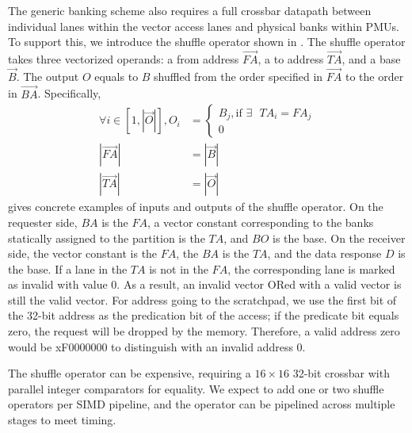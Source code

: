 The generic banking scheme also requires a full crossbar datapath between individual lanes within
the vector access lanes and physical banks within PMUs. 
To support this, we introduce the shuffle operator shown in .
The shuffle operator takes three vectorized operands: a from address $\overrightarrow{FA}$, a to address
$\overrightarrow{TA}$, and a base $\overrightarrow{B}$.
The output $O$ equals to $B$ shuffled from the order specified in $\overrightarrow{FA}$ to the order in
$\overrightarrow{BA}$. 
Specifically,
\begin{align}
\forall i \in [1,|\overrightarrow{O}|],
O_i &= \begin{cases}
B_j, \text{if $\exists$ $TA_i = FA_j$}\\
0
\end{cases} \\
|\overrightarrow{FA}| &= |\overrightarrow{B}| \\
|\overrightarrow{TA}| &= |\overrightarrow{O}|
\end{align}
 gives concrete examples of inputs and outputs of the shuffle operator.
On the requester side, $BA$ is the $FA$, a vector constant corresponding to the banks statically
assigned to the partition is the $TA$, and $BO$ is the base.
On the receiver side, the vector constant is the $FA$, the $BA$ is the $TA$, and the data response
$D$ is the base.
If a lane in the $TA$ is not in the $FA$, the corresponding lane is marked as invalid with value
$0$. As a result, an invalid vector ORed with a valid vector is still the valid vector.
For address going to the scratchpad, we use the first bit of the 32-bit address as the predication
bit of the access; if the predicate bit equals zero, the request will be dropped by the memory.
Therefore, a valid address zero would be xF0000000 to distinguish with an invalid address 0.

The shuffle operator can be expensive, requiring a $16\times16$ 32-bit crossbar with parallel
integer comparators for equality. We expect to add one or two shuffle operators per SIMD pipeline,
and the operator can be pipelined across multiple stages to meet timing.
